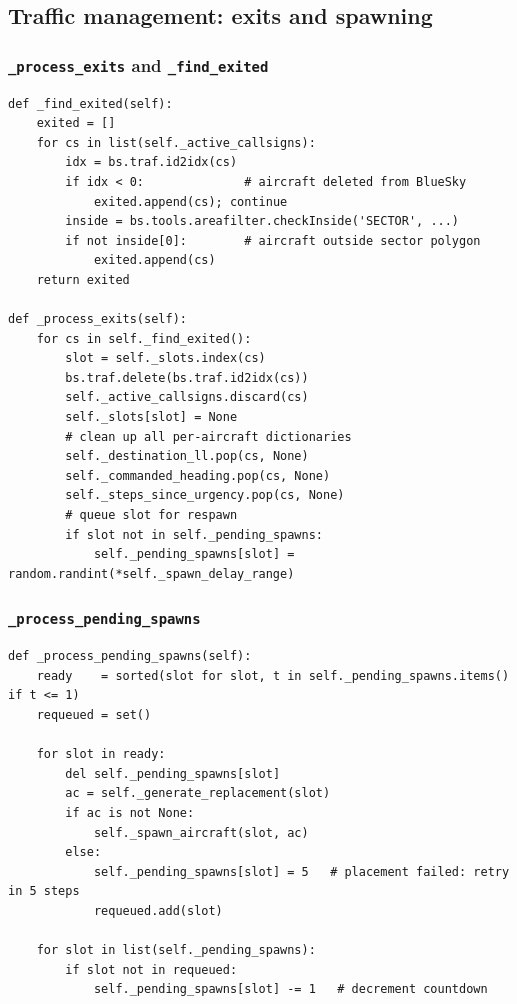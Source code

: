 \documentclass[11pt, a4paper]{article}
\begin{document}
\subsection{Traffic management: exits and spawning}

\subsubsection{\texttt{\_process\_exits} and \texttt{\_find\_exited}}

\begin{lstlisting}[caption={Removing aircraft that have left the sector.}]
def _find_exited(self):
    exited = []
    for cs in list(self._active_callsigns):
        idx = bs.traf.id2idx(cs)
        if idx < 0:              # aircraft deleted from BlueSky
            exited.append(cs); continue
        inside = bs.tools.areafilter.checkInside('SECTOR', ...)
        if not inside[0]:        # aircraft outside sector polygon
            exited.append(cs)
    return exited

def _process_exits(self):
    for cs in self._find_exited():
        slot = self._slots.index(cs)
        bs.traf.delete(bs.traf.id2idx(cs))
        self._active_callsigns.discard(cs)
        self._slots[slot] = None
        # clean up all per-aircraft dictionaries
        self._destination_ll.pop(cs, None)
        self._commanded_heading.pop(cs, None)
        self._steps_since_urgency.pop(cs, None)
        # queue slot for respawn
        if slot not in self._pending_spawns:
            self._pending_spawns[slot] = random.randint(*self._spawn_delay_range)
\end{lstlisting}

\subsubsection{\texttt{\_process\_pending\_spawns}}

\begin{lstlisting}[caption={Countdown-based respawn logic.}]
def _process_pending_spawns(self):
    ready    = sorted(slot for slot, t in self._pending_spawns.items() if t <= 1)
    requeued = set()

    for slot in ready:
        del self._pending_spawns[slot]
        ac = self._generate_replacement(slot)
        if ac is not None:
            self._spawn_aircraft(slot, ac)
        else:
            self._pending_spawns[slot] = 5   # placement failed: retry in 5 steps
            requeued.add(slot)

    for slot in list(self._pending_spawns):
        if slot not in requeued:
            self._pending_spawns[slot] -= 1   # decrement countdown
\end{lstlisting}
\end{document}
